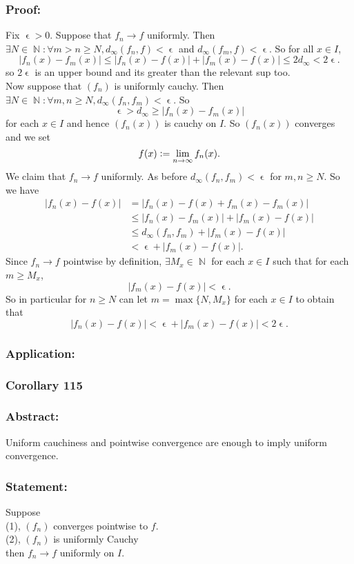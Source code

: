 \documentclass{article}
\DeclareMathOperator\eps{\epsilon}
\DeclareMathOperator\N{\mathbb{N}}
\begin{document}
\subsubsection*{Proof:}
Fix $\eps>0$. Suppose that $f_n \to f$ uniformly. Then $\exists N \in \N: \forall m>n \geq N,
d_{\infty}(f_n,f)< \eps$ and $d_{\infty}(f_m,f) < \eps$. So for all $x \in I$, $$
|f_n(x) -f_m(x)| \leq |f_n(x)-f(x)| + |f_m(x)-f(x)| \leq 2d_{\infty} < 2 \eps.
$$
so $2 \eps$ is an upper bound and its greater than the relevant sup too. \\
\newline
Now suppose that $(f_n)$ is uniformly cauchy. Then $\exists N \in \N: \forall m,n \geq N,
d_{\infty}(f_n,f_m)< \eps$. So $$
\eps > d_{\infty} \geq |f_n(x)-f_m(x)|
$$
for each $x \in I$ and hence $(f_n(x))$ is cauchy on $I$. So $(f_n(x))$ converges
and we set $$
f(x) \vcentcolon= \lim_{n \to \infty}f_n(x).
$$
We claim that $f_n \to f$ uniformly.
As before $d_{\infty}(f_n,f_m)< \eps$ for $m,n \geq N$.
So we have \begin{align*}
|f_n(x)-f(x)| &= |f_n(x)-f(x)+f_m(x) -f_m(x)| \\
& \leq |f_n(x)-f_m(x)| + |f_m(x)-f(x)| \\
& \leq d_{\infty}(f_n,f_m) + |f_m(x)-f(x)| \\
&< \eps + |f_m(x)-f(x)|.
\end{align*}
Since $f_n \to f$ pointwise by definition, $\exists M_x \in \N$ for each $x \in I$
such that for each $m \geq M_x$, $$|f_m(x)-f(x)| < \eps.$$
So in particular for $n \geq N$ can let $m = \max \{N,M_x \}$ for each $x \in I$
to obtain that $$
|f_n(x)-f(x)|<\eps+|f_m(x)-f(x)|<2 \eps.
$$
\subsubsection*{Application:}

\subsubsection*{Corollary 115}
\subsubsection*{Abstract:}
Uniform cauchiness and pointwise convergence are enough to imply
uniform convergence.
\subsubsection*{Statement:}
Suppose \\
\newline
(1), $(f_n)$ converges pointwise to $f$. \\
\newline
(2), $(f_n)$ is uniformly Cauchy \\
\newline
then $f_n \to f$ uniformly on $I$.
\end{document}
